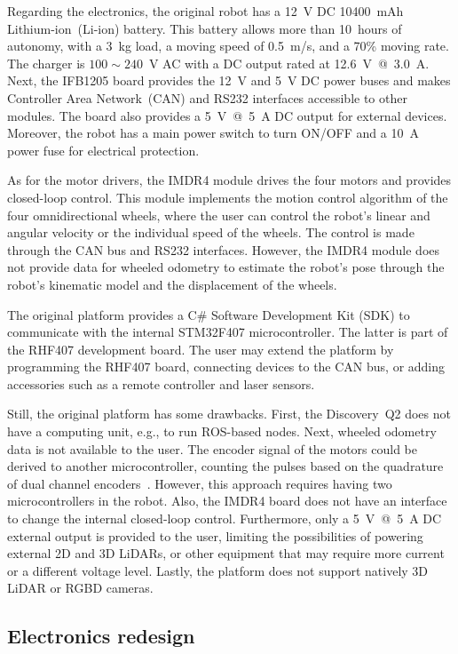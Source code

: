 \documentclass[letterpaper,10pt,conference]{IEEEtran} %
\begin{document}
Regarding the electronics, the original robot
has a 12~V DC 10400~mAh Lithium-ion~(Li-ion) battery.
This battery allows more than 10~hours of autonomy,
with a 3~kg load, a moving speed of 0.5~m/s, and a 70\% moving rate.
The charger is $100\sim 240$~V AC with a DC output rated at 12.6~V~@~3.0~A.
Next, the IFB1205 board provides the 12~V and 5~V DC power buses
and makes Controller Area Network~(CAN) and RS232 interfaces
accessible to other modules.
The board also provides a 5~V~@~5~A DC output for external devices.
Moreover, the robot has a main power switch to turn ON/OFF
and a 10~A power fuse for electrical protection.

As for the motor drivers,
the IMDR4 module drives the four motors and provides closed-loop control.
This module implements the motion control algorithm of the
four omnidirectional wheels,
where the user can control the robot's linear and angular velocity
or the individual speed of the wheels.
The control is made through the CAN bus and RS232 interfaces.
However, the IMDR4 module does not provide data for wheeled odometry
to estimate the robot's pose through the 
robot's kinematic model and the displacement of the wheels.

The original platform provides a C\# Software Development Kit (SDK)
to communicate with the internal STM32F407 microcontroller.
The latter is part of the RHF407 development board.
The user may extend the platform by programming the RHF407 board,
connecting devices to the CAN bus,
or adding accessories such as a remote controller and laser sensors.

Still, the original platform has some drawbacks.
First, the Discovery~Q2 does not have a computing unit,
e.g., to run ROS-based nodes.
Next, wheeled odometry data is not available to the user.
The encoder signal of the motors could be derived to
another microcontroller, counting the pulses
based on the quadrature of dual channel encoders~\cite{sa2016mscthesis}.
However, this approach requires having two microcontrollers in the robot.
Also, the IMDR4 board does not have an interface
to change the internal closed-loop control.
Furthermore, only a 5~V~@~5~A DC external output is provided to the user,
limiting the possibilities of powering external 2D and 3D LiDARs,
or other equipment that may require more current or a different voltage level.
Lastly, the platform does not support natively 3D LiDAR or RGBD cameras.

\subsection{Electronics redesign}
\end{document}
